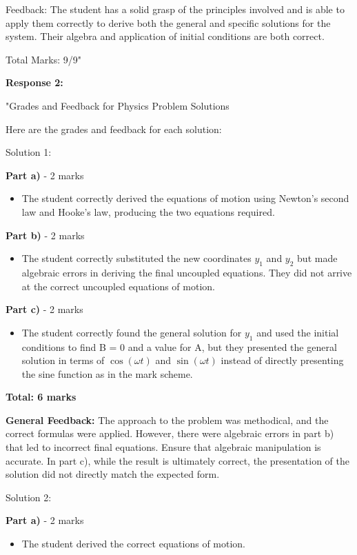 \documentclass[a4paper,11pt]{article}
\begin{document}
\noindent Feedback: The student has a solid grasp of the principles involved and is able to apply them correctly to derive both the general and specific solutions for the system. Their algebra and application of initial conditions are both correct.

\noindent Total Marks: 9/9"

\textbf{Response 2:}

"Grades and Feedback for Physics Problem Solutions

Here are the grades and feedback for each solution:

Solution 1:

\textbf{Part a)} - 2 marks
\begin{itemize}
    \item The student correctly derived the equations of motion using Newton’s second law and Hooke’s law, producing the two equations required.
\end{itemize}

\textbf{Part b)} - 2 marks
\begin{itemize}
    \item The student correctly substituted the new coordinates \( y_{1} \) and \( y_{2} \) but made algebraic errors in deriving the final uncoupled equations. They did not arrive at the correct uncoupled equations of motion.
\end{itemize}

\textbf{Part c)} - 2 marks
\begin{itemize}
    \item The student correctly found the general solution for \( y_1 \) and used the initial conditions to find B = 0 and a value for A, but they presented the general solution in terms of \( \cos(\omega t) \) and \( \sin(\omega t) \) instead of directly presenting the sine function as in the mark scheme.
\end{itemize}

\textbf{Total: 6 marks}

\textbf{General Feedback:} The approach to the problem was methodical, and the correct formulas were applied. However, there were algebraic errors in part b) that led to incorrect final equations. Ensure that algebraic manipulation is accurate. In part c), while the result is ultimately correct, the presentation of the solution did not directly match the expected form.

Solution 2:

\textbf{Part a)} - 2 marks
\begin{itemize}
    \item The student derived the correct equations of motion.
\end{itemize}
\end{document}
